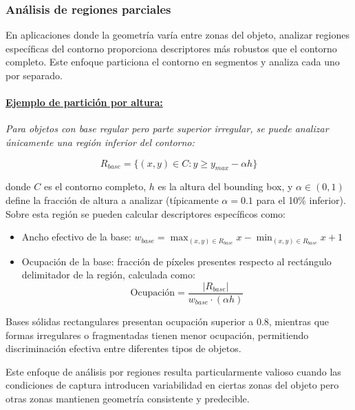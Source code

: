 \subsubsection{Análisis de regiones parciales}

En aplicaciones donde la geometría varía entre zonas del objeto, analizar regiones específicas del contorno proporciona descriptores más robustos que el contorno completo. Este enfoque particiona el contorno en segmentos y analiza cada uno por separado.

\paragraph{\underline{Ejemplo de partición por altura:}} \textit{Para objetos con base regular pero parte superior irregular, se puede analizar únicamente una región inferior del contorno:}

\begin{equation}
R_{base} = \{(x,y) \in C : y \geq y_{max} - \alpha h\}
\end{equation}

donde $C$ es el contorno completo, $h$ es la altura del bounding box, y $\alpha \in (0,1)$ define la fracción de altura a analizar (típicamente $\alpha = 0.1$ para el 10\% inferior). Sobre esta región se pueden calcular descriptores específicos como:

\begin{itemize}[label=$\bullet$]
\item Ancho efectivo de la base: $w_{base} = \max_{(x,y) \in R_{base}} x - \min_{(x,y) \in R_{base}} x + 1$

\item Ocupación de la base: fracción de píxeles presentes respecto al rectángulo delimitador de la región, calculada como:
\begin{equation}
\text{Ocupación} = \frac{|R_{base}|}{w_{base} \cdot (\alpha h)}
\end{equation}
\end{itemize}

Bases sólidas rectangulares presentan ocupación superior a 0.8, mientras que formas irregulares o fragmentadas tienen menor ocupación, permitiendo discriminación efectiva entre diferentes tipos de objetos.

Este enfoque de análisis por regiones resulta particularmente valioso cuando las condiciones de captura introducen variabilidad en ciertas zonas del objeto pero otras zonas mantienen geometría consistente y predecible.
